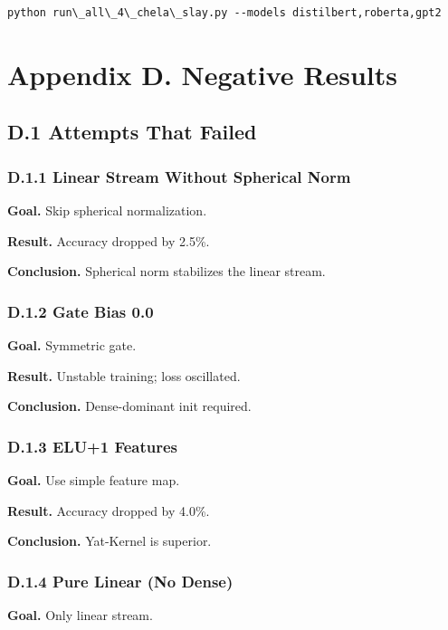 \begin{lstlisting}
python run\_all\_4\_chela\_slay.py --models distilbert,roberta,gpt2
\end{lstlisting}



\section{Appendix D. Negative Results}

\subsection{D.1 Attempts That Failed}

\subsubsection{D.1.1 Linear Stream Without Spherical Norm}

\textbf{Goal.} Skip spherical normalization.

\textbf{Result.} Accuracy dropped by 2.5\%.

\textbf{Conclusion.} Spherical norm stabilizes the linear stream.

\subsubsection{D.1.2 Gate Bias 0.0}

\textbf{Goal.} Symmetric gate.

\textbf{Result.} Unstable training; loss oscillated.

\textbf{Conclusion.} Dense-dominant init required.

\subsubsection{D.1.3 ELU+1 Features}

\textbf{Goal.} Use simple feature map.

\textbf{Result.} Accuracy dropped by 4.0\%.

\textbf{Conclusion.} Yat-Kernel is superior.

\subsubsection{D.1.4 Pure Linear (No Dense)}

\textbf{Goal.} Only linear stream.


